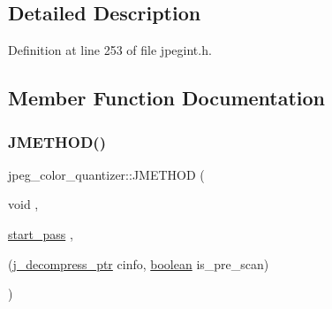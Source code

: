 \subsection{Detailed Description}


Definition at line 253 of file jpegint.\+h.



\subsection{Member Function Documentation}
\mbox{\label{structjpeg__color__quantizer_a3296d9d04a267c50808154ce6bdcef1b}} 
\subsubsection{\texorpdfstring{JMETHOD()}{JMETHOD()}\hspace{0.1cm}{\footnotesize\ttfamily [1/4]}}
{\footnotesize\ttfamily jpeg\+\_\+color\+\_\+quantizer\+::\+J\+M\+E\+T\+H\+OD (\begin{DoxyParamCaption}\item[{void}]{,  }\item[{\mbox{\hyperlink{jddctmgr_8c_a1964f006adb8fb80f57e455f6452aec1}{start\+\_\+pass}}}]{,  }\item[{(\mbox{\hyperlink{jpeglib_8h_a00c7d78af44bd26a901c791ccfc1e178}{j\+\_\+decompress\+\_\+ptr}} cinfo, \mbox{\hyperlink{jmorecfg_8h_a7c6368b321bd9acd0149b030bb8275ed}{boolean}} is\+\_\+pre\+\_\+scan)}]{ }\end{DoxyParamCaption})}

\mbox{\label{structjpeg__color__quantizer_ac11184c8e0fdc9c0ec200c0fab197b5f}} 
